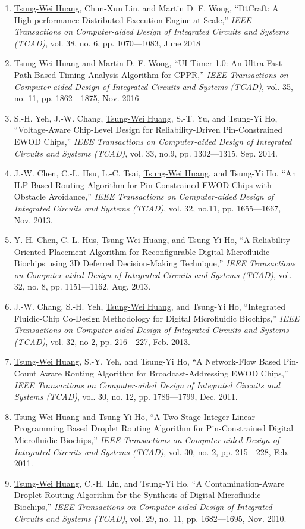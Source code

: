 \documentclass[A4,11pt]{article}
\begin{document}
\begin{enumerate}
  \item \underline{Tsung-Wei Huang}, Chun-Xun Lin, and Martin D. F. Wong, ``DtCraft: A High-performance Distributed Execution Engine at Scale,'' \textit{IEEE Transactions on Computer-aided Design of Integrated Circuits and Systems (TCAD)}, vol. 38, no. 6, pp. 1070—1083, June 2018
  \item \underline{Tsung-Wei Huang} and Martin D. F. Wong, ``UI-Timer 1.0: An Ultra-Fast Path-Based Timing Analysis Algorithm for CPPR,'' \textit{IEEE Transactions on Computer-aided Design of Integrated Circuits and Systems (TCAD)}, vol. 35, no. 11, pp. 1862—1875, Nov. 2016
  \item S.-H. Yeh, J.-W. Chang, \underline{Tsung-Wei Huang}, S.-T. Yu, and Tsung-Yi Ho, ``Voltage-Aware Chip-Level Design for Reliability-Driven Pin-Constrained EWOD Chips,'' \textit{IEEE Transactions on Computer-aided Design of Integrated Circuits and Systems (TCAD)}, vol. 33, no.9, pp. 1302—1315, Sep. 2014. 
  \item J.-W. Chen, C.-L. Hsu, L.-C. Tsai, \underline{Tsung-Wei Huang}, and Tsung-Yi Ho, ``An ILP-Based Routing Algorithm for Pin-Constrained EWOD Chips with Obstacle Avoidance,'' \textit{IEEE Transactions on Computer-aided Design of Integrated Circuits and Systems (TCAD)}, vol. 32, no.11, pp. 1655—1667, Nov. 2013.
  \item Y.-H. Chen, C.-L. Hus, \underline{Tsung-Wei Huang}, and Tsung-Yi Ho, ``A Reliability-Oriented Placement Algorithm for Reconfigurable Digital Microfluidic Biochips using 3D Deferred Decision-Making Technique,'' \textit{IEEE Transactions on Computer-aided Design of Integrated Circuits and Systems (TCAD)}, vol. 32, no. 8, pp. 1151—1162, Aug. 2013.
  \item J.-W. Chang, S.-H. Yeh, \underline{Tsung-Wei Huang}, and Tsung-Yi Ho, ``Integrated Fluidic-Chip Co-Design Methodology for Digital Microfluidic Biochips,'' \textit{IEEE Transactions on Computer-aided Design of Integrated Circuits and Systems (TCAD)}, vol. 32, no 2, pp. 216—227, Feb. 2013.
  \item \underline{Tsung-Wei Huang}, S.-Y. Yeh, and Tsung-Yi Ho, ``A Network-Flow Based Pin-Count Aware Routing Algorithm for Broadcast-Addressing EWOD Chips,'' \textit{IEEE Transactions on Computer-aided Design of Integrated Circuits and Systems (TCAD)}, vol. 30, no. 12, pp. 1786—1799, Dec. 2011.
  \item \underline{Tsung-Wei Huang} and Tsung-Yi Ho, ``A Two-Stage Integer-Linear-Programming Based Droplet Routing Algorithm for Pin-Constrained Digital Microfluidic Biochips,'' \textit{IEEE Transactions on Computer-aided Design of Integrated Circuits and Systems (TCAD)}, vol. 30, no. 2, pp. 215—228, Feb. 2011. 
  \item \underline{Tsung-Wei Huang}, C.-H. Lin, and Tsung-Yi Ho, ``A Contamination-Aware Droplet Routing Algorithm for the Synthesis of Digital Microfluidic Biochips,'' \textit{IEEE Transactions on Computer-aided Design of Integrated Circuits and Systems (TCAD)}, vol. 29, no. 11, pp. 1682—1695, Nov. 2010. 

 \end{enumerate}
\end{document}
